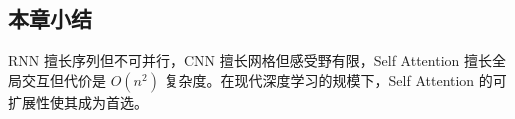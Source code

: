 \subsection{本章小结}

RNN 擅长序列但不可并行，CNN 擅长网格但感受野有限，Self Attention 擅长全局交互但代价是 $O(n^2)$ 复杂度。在现代深度学习的规模下，Self Attention 的可扩展性使其成为首选。


